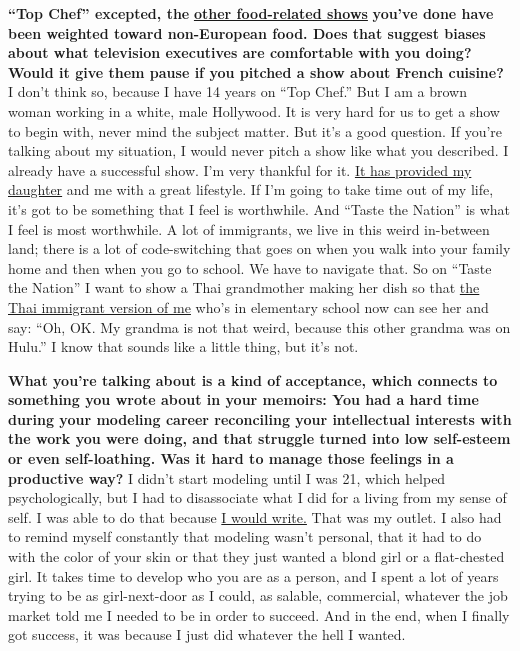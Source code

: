 \textbf{``Top Chef'' excepted, the}
\textbf{\href{http://nytimes3xbfgragh.onion\#tooltip-8}{other
food-related shows}} \textbf{you've done have been weighted toward
non-European food. Does that suggest biases about what television
executives are comfortable with you doing? Would it give them pause if
you pitched a show about French cuisine?} I don't think so, because I
have 14 years on ``Top Chef.'' But I am a brown woman working in a
white, male Hollywood. It is very hard for us to get a show to begin
with, never mind the subject matter. But it's a good question. If you're
talking about my situation, I would never pitch a show like what you
described. I already have a successful show. I'm very thankful for it.
\href{http://nytimes3xbfgragh.onion\#tooltip-9}{It has provided my
daughter} and me with a great lifestyle. If I'm going to take time out
of my life, it's got to be something that I feel is worthwhile. And
``Taste the Nation'' is what I feel is most worthwhile. A lot of
immigrants, we live in this weird in-between land; there is a lot of
code-switching that goes on when you walk into your family home and then
when you go to school. We have to navigate that. So on ``Taste the
Nation'' I want to show a Thai grandmother making her dish so that
\href{http://nytimes3xbfgragh.onion\#tooltip-10}{the Thai immigrant
version of me} who's in elementary school now can see her and say: ``Oh,
OK. My grandma is not that weird, because this other grandma was on
Hulu.'' I know that sounds like a little thing, but it's not.

\textbf{What you're talking about is a kind of acceptance, which
connects to something you wrote about in your memoirs: You had a hard
time during your modeling career reconciling your intellectual interests
with the work you were doing, and that struggle turned into low
self-esteem or even self-loathing. Was it hard to manage those feelings
in a productive way?} I didn't start modeling until I was 21, which
helped psychologically, but I had to disassociate what I did for a
living from my sense of self. I was able to do that because
\href{http://nytimes3xbfgragh.onion\#tooltip-11}{I would write.} That
was my outlet. I also had to remind myself constantly that modeling
wasn't personal, that it had to do with the color of your skin or that
they just wanted a blond girl or a flat-chested girl. It takes time to
develop who you are as a person, and I spent a lot of years trying to be
as girl-next-door as I could, as salable, commercial, whatever the job
market told me I needed to be in order to succeed. And in the end, when
I finally got success, it was because I just did whatever the hell I
wanted.

